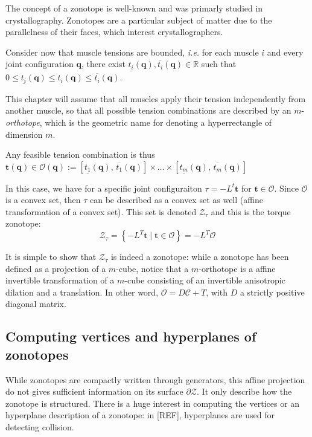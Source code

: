 The concept of a zonotope is well-known and was primarly studied in crystallography.
Zonotopes are a particular subject of matter due to the parallelness of their faces, which
interest crystallographers.

Consider now that muscle tensions are bounded, \textit{i.e.} for each muscle $i$ and every joint configuration $\mathbf{q}$,
there exist $\underline{t_i}(\mathbf{q}), \overline{t_i}(\mathbf{q}) \in \mathbb{R}$ such
that $0 \leq \underline{t_i}(\mathbf{q}) \leq t_i(\mathbf{q}) \leq \overline{t_i}(\mathbf{q})$.

This chapter will assume that all muscles apply their tension independently from another muscle, so that 
all possible tension combinations are described by an $m$-\textit{orthotope}, which is the geometric name for 
denoting a hyperrectangle of dimension $m$.

Any feasible tension combination is thus $\mathbf{t}(\mathbf{q}) \in \mathcal{O}(\mathbf{q}) := 
\left[\underline{t_1}(\mathbf{q}),\, \overline{t_1}(\mathbf{q})\right] \times
\dots \times
\left[\underline{t_m}(\mathbf{q}),\, \overline{t_m}(\mathbf{q})\right] $

In this case, we have for a specific joint configuraiton 
$\tau = -L^t\mathbf{t}$ for $\mathbf{t}\in\mathcal{O}$. Since $\mathcal{O}$ is a convex set, 
then $\tau$ can be described as a convex set as well (affine transformation of a convex set).
This set is denoted $\mathcal{Z}_{\tau}$ and this is the torque zonotope:
$$\mathcal{Z}_{\tau} = \left\{-L^T\mathbf{t} \mid \mathbf{t}\in \mathcal{O} \right\} = -L^T\mathcal{O}$$

It is simple to show that $\mathcal{Z}_{\tau}$ is indeed a zonotope: while a zonotope has been defined as a 
projection of a $m$-cube, notice that a $m$-orthotope is a affine invertible transformation of a $m$-cube
consisting of an invertible anisotropic dilation and a translation. In other word, $\mathcal{O} = D\mathcal{C} + T$,
with $D$ a strictly positive diagonal matrix. 

\subsection{Computing vertices and hyperplanes of zonotopes}
While zonotopes are compactly written through generators, this affine projection do not gives sufficient information
on its surface $\partial \mathcal{Z}$. It only describe how the zonotope is structured.
There is a huge interest in computing the vertices or an hyperplane description of a zonotope: in [REF], hyperplanes
are used for detecting collision.


